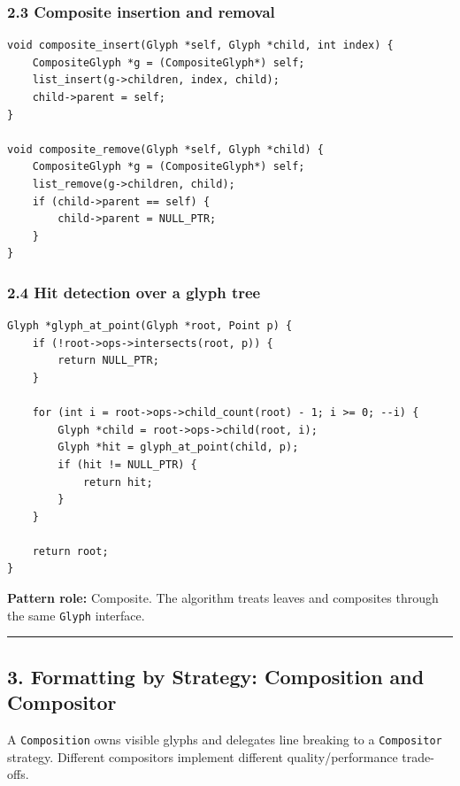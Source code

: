 \documentclass[11pt]{article}
\begin{document}
\subsubsection{2.3 Composite insertion and removal}\label{composite-insertion-and-removal}

\begin{verbatim}
void composite_insert(Glyph *self, Glyph *child, int index) {
    CompositeGlyph *g = (CompositeGlyph*) self;
    list_insert(g->children, index, child);
    child->parent = self;
}

void composite_remove(Glyph *self, Glyph *child) {
    CompositeGlyph *g = (CompositeGlyph*) self;
    list_remove(g->children, child);
    if (child->parent == self) {
        child->parent = NULL_PTR;
    }
}
\end{verbatim}

\subsubsection{2.4 Hit detection over a glyph tree}\label{hit-detection-over-a-glyph-tree}

\begin{verbatim}
Glyph *glyph_at_point(Glyph *root, Point p) {
    if (!root->ops->intersects(root, p)) {
        return NULL_PTR;
    }

    for (int i = root->ops->child_count(root) - 1; i >= 0; --i) {
        Glyph *child = root->ops->child(root, i);
        Glyph *hit = glyph_at_point(child, p);
        if (hit != NULL_PTR) {
            return hit;
        }
    }

    return root;
}
\end{verbatim}

\textbf{Pattern role:} Composite. The algorithm treats leaves and composites through the same \texttt{Glyph} interface.

\begin{center}\rule{0.5\linewidth}{0.5pt}\end{center}

\subsection{3. Formatting by Strategy: Composition and Compositor}\label{formatting-by-strategy-composition-and-compositor}

A \texttt{Composition} owns visible glyphs and delegates line breaking to a \texttt{Compositor} strategy. Different compositors implement different quality/performance trade-offs.
\end{document}
